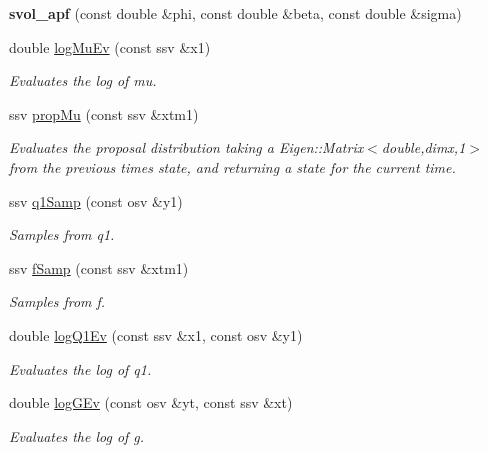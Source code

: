 \begin{DoxyCompactItemize}
\item 
{\bfseries svol\+\_\+apf} (const double \&phi, const double \&beta, const double \&sigma)\hypertarget{classsvol__apf_a28d5a4ff45ad0a032f0e4cea6e965f9f}{}\label{classsvol__apf_a28d5a4ff45ad0a032f0e4cea6e965f9f}

\item 
double \hyperlink{classsvol__apf_a9dbbcbc106bb368c0745a9a3c59b8a40}{log\+Mu\+Ev} (const ssv \&x1)
\begin{DoxyCompactList}\small\item\em Evaluates the log of mu. \end{DoxyCompactList}\item 
ssv \hyperlink{classsvol__apf_aa64250b9714e0a75a99ad009ce953062}{prop\+Mu} (const ssv \&xtm1)
\begin{DoxyCompactList}\small\item\em Evaluates the proposal distribution taking a Eigen\+::\+Matrix$<$double,dimx,1$>$ from the previous time\textquotesingle{}s state, and returning a state for the current time. \end{DoxyCompactList}\item 
ssv \hyperlink{classsvol__apf_a949bda5a3a8bb5d92f30491a23f6b479}{q1\+Samp} (const osv \&y1)
\begin{DoxyCompactList}\small\item\em Samples from q1. \end{DoxyCompactList}\item 
ssv \hyperlink{classsvol__apf_ada8a6974fbbc065bd338864aa2b164c0}{f\+Samp} (const ssv \&xtm1)
\begin{DoxyCompactList}\small\item\em Samples from f. \end{DoxyCompactList}\item 
double \hyperlink{classsvol__apf_a54cf3230fd24f48871bd4dc408f2fc88}{log\+Q1\+Ev} (const ssv \&x1, const osv \&y1)
\begin{DoxyCompactList}\small\item\em Evaluates the log of q1. \end{DoxyCompactList}\item 
double \hyperlink{classsvol__apf_a982049d7bcd15d7677f4b4c31d197b00}{log\+G\+Ev} (const osv \&yt, const ssv \&xt)
\begin{DoxyCompactList}\small\item\em Evaluates the log of g. \end{DoxyCompactList}\end{DoxyCompactItemize}
